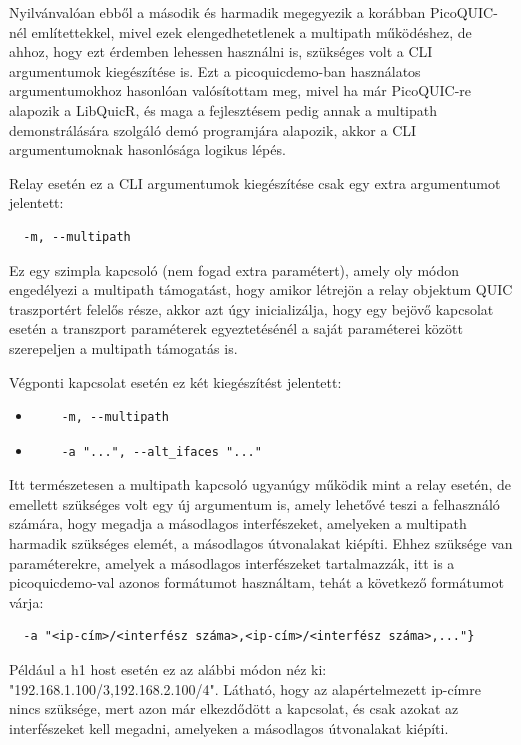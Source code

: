 \documentclass[a4paper,oneside]{article}
\begin{document}
Nyilvánvalóan ebből a második és harmadik megegyezik a korábban PicoQUIC-nél említettekkel, mivel ezek elengedhetetlenek a multipath működéshez,
de ahhoz, hogy ezt érdemben lehessen használni is, szükséges volt a CLI argumentumok kiegészítése is.
Ezt a picoquicdemo-ban használatos argumentumokhoz hasonlóan 
valósítottam meg, mivel ha már PicoQUIC-re alapozik a LibQuicR, és maga a fejlesztésem pedig annak a 
multipath demonstrálására szolgáló demó programjára alapozik, akkor a CLI argumentumoknak hasonlósága logikus lépés.

Relay esetén ez a CLI argumentumok kiegészítése csak egy extra argumentumot jelentett:
\begin{verbatim}
  -m, --multipath
\end{verbatim}
Ez egy szimpla kapcsoló (nem fogad extra paramétert), amely oly módon engedélyezi a multipath támogatást, hogy amikor létrejön a relay objektum QUIC traszportért felelős része,
akkor azt úgy inicializálja, hogy egy bejövő kapcsolat esetén a transzport paraméterek egyeztetésénél a saját paraméterei között szerepeljen a multipath támogatás is.

Végponti kapcsolat esetén ez két kiegészítést jelentett:
\begin{itemize}
  \item 
  \begin{verbatim}
    -m, --multipath
  \end{verbatim}

  \item \begin{verbatim}
    -a "...", --alt_ifaces "..."
  \end{verbatim}
\end{itemize}

Itt természetesen a multipath kapcsoló ugyanúgy működik mint a relay esetén,
de emellett szükséges volt egy új argumentum is, amely lehetővé teszi a felhasználó számára, hogy megadja a másodlagos interfészeket,
amelyeken a multipath harmadik szükséges elemét, a másodlagos útvonalakat kiépíti. Ehhez szüksége van paraméterekre, amelyek a másodlagos interfészeket
tartalmazzák, itt is a picoquicdemo-val azonos formátumot használtam, tehát a következő formátumot várja:
\begin{verbatim}
  -a "<ip-cím>/<interfész száma>,<ip-cím>/<interfész száma>,..."}
\end{verbatim}
Például a h1 host esetén ez az alábbi módon néz ki: "192.168.1.100/3,192.168.2.100/4". Látható, hogy az alapértelmezett ip-címre nincs 
szüksége, mert azon már elkezdődött a kapcsolat, és csak azokat az interfészeket kell megadni, amelyeken a másodlagos útvonalakat kiépíti. 
\end{document}
